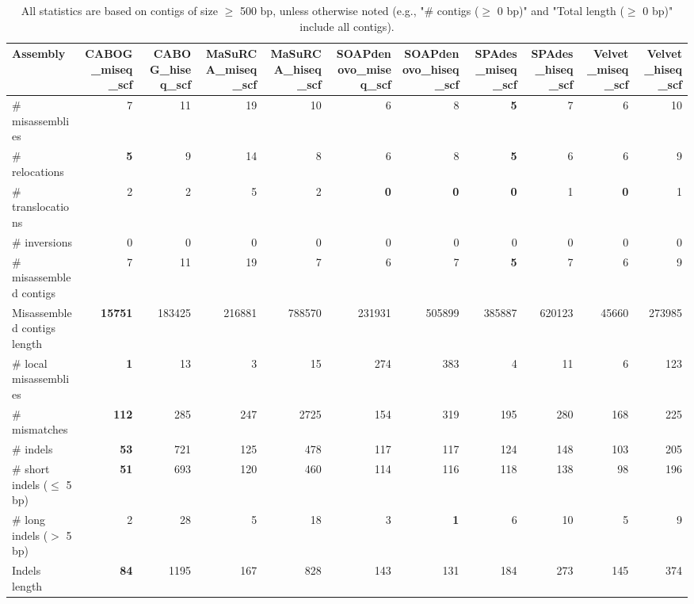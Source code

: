\documentclass[12pt,a4paper]{article}
\begin{document}
\begin{table}[ht]
\begin{center}
\caption{All statistics are based on contigs of size $\geq$ 500 bp, unless otherwise noted (e.g., "\# contigs ($\geq$ 0 bp)" and "Total length ($\geq$ 0 bp)" include all contigs).}
\begin{tabular}{|l*{10}{|r}|}
\hline
Assembly & CABOG\_miseq\_scf & CABOG\_hiseq\_scf & MaSuRCA\_miseq\_scf & MaSuRCA\_hiseq\_scf & SOAPdenovo\_miseq\_scf & SOAPdenovo\_hiseq\_scf & SPAdes\_miseq\_scf & SPAdes\_hiseq\_scf & Velvet\_miseq\_scf & Velvet\_hiseq\_scf \\ \hline
\# misassemblies & 7 & 11 & 19 & 10 & 6 & 8 & {\bf 5} & 7 & 6 & 10 \\ \hline
\hspace{5mm}\# relocations & {\bf 5} & 9 & 14 & 8 & 6 & 8 & {\bf 5} & 6 & 6 & 9 \\ \hline
\hspace{5mm}\# translocations & 2 & 2 & 5 & 2 & {\bf 0} & {\bf 0} & {\bf 0} & 1 & {\bf 0} & 1 \\ \hline
\hspace{5mm}\# inversions & 0 & 0 & 0 & 0 & 0 & 0 & 0 & 0 & 0 & 0 \\ \hline
\# misassembled contigs & 7 & 11 & 19 & 7 & 6 & 7 & {\bf 5} & 7 & 6 & 9 \\ \hline
Misassembled contigs length & {\bf 15751} & 183425 & 216881 & 788570 & 231931 & 505899 & 385887 & 620123 & 45660 & 273985 \\ \hline
\# local misassemblies & {\bf 1} & 13 & 3 & 15 & 274 & 383 & 4 & 11 & 6 & 123 \\ \hline
\# mismatches & {\bf 112} & 285 & 247 & 2725 & 154 & 319 & 195 & 280 & 168 & 225 \\ \hline
\# indels & {\bf 53} & 721 & 125 & 478 & 117 & 117 & 124 & 148 & 103 & 205 \\ \hline
\hspace{5mm}\# short indels ($\leq$ 5 bp) & {\bf 51} & 693 & 120 & 460 & 114 & 116 & 118 & 138 & 98 & 196 \\ \hline
\hspace{5mm}\# long indels ($>$ 5 bp) & 2 & 28 & 5 & 18 & 3 & {\bf 1} & 6 & 10 & 5 & 9 \\ \hline
Indels length & {\bf 84} & 1195 & 167 & 828 & 143 & 131 & 184 & 273 & 145 & 374 \\ \hline
\end{tabular}
\end{center}
\end{table}
\end{document}
